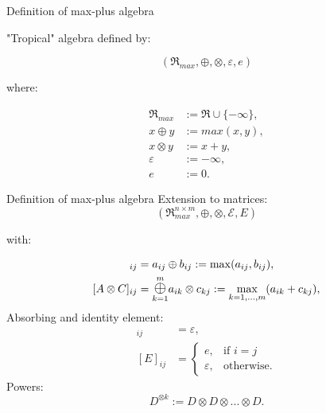 \documentclass{beamer}
\begin{document}
\begin{frame}{Definition of max-plus algebra}

"Tropical" algebra defined by:
	
	\begin{equation*}
		(\Re_{max}, \oplus, \otimes, \varepsilon, e)
	\end{equation*}
	
	where:
	
	\begin{align*}
		\Re_{max} &:= \Re \cup \{-\infty\}, \nonumber\\
		x \oplus y &:= max(x,y), \nonumber\\
		x \otimes y &:= x + y, \nonumber\\
		\varepsilon &:= -\infty, \nonumber\\
		e &:= 0. \nonumber
	\end{align*}
\end{frame}

\begin{frame}{Definition of max-plus algebra}
\vspace{20pt}
Extension to matrices:
\begin{equation*}
		(\Re_{max}^{n\times m}, \oplus, \otimes,\mathcal{E}, E)
	\end{equation*}
	
	with:
	
	\begin{align*}
		[A \oplus B]_{ij} &= a_{ij} \oplus b_{ij} := \max(a_{ij},b_{ij}), \nonumber \\
		[A \otimes C]_{ij} &= \underset{k=1}{\overset{m}{\mathlarger{\mathlarger\oplus}}}a_{ik} \otimes c_{kj} := \max\limits_{k=1,...,m}(a_{ik} + c_{kj}), \nonumber 
	\end{align*}
	Absorbing and identity element:
	\begin{align}
			[\mathcal{E}]_{ij} &= \varepsilon, \nonumber \\
			[E]_{ij} &= \begin{cases}
				e, & \text{if } i =j \\
				\varepsilon,& \text{otherwise.}
			\end{cases} \nonumber
		\end{align}
	Powers:
	\begin{equation*}
			D^{\otimes k} := D \otimes D \otimes... \otimes D.
	\end{equation*}
\end{frame}
\end{document}
